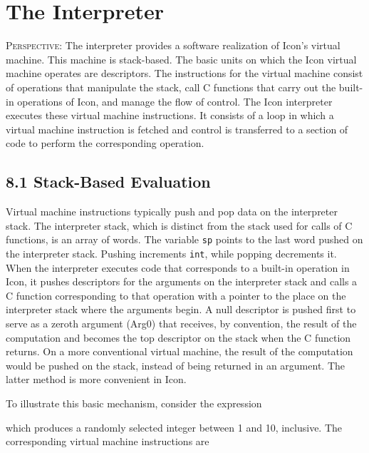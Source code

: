 \chapter{The Interpreter}

\textsc{Perspective}: The interpreter provides a software realization
of Icon's virtual machine. This machine is stack-based. The basic
units on which the Icon virtual machine operates are descriptors. The
instructions for the virtual machine consist of operations that
manipulate the stack, call C functions that carry out the built-in
operations of Icon, and manage the flow of control. The Icon
interpreter executes these virtual machine instructions.  It consists
of a loop in which a virtual machine instruction is fetched and
control is transferred to a section of code to perform the
corresponding operation.

\section[8.1 Stack-Based Evaluation]{8.1 Stack-Based Evaluation}

Virtual machine instructions typically push and pop data on the
interpreter stack. The interpreter stack, which is distinct from the
stack used for calls of C functions, is an array of words. The
variable \texttt{sp} points to the last word pushed on the interpreter
stack. Pushing increments \texttt{int}, while popping decrements
it. When the interpreter executes code that corresponds to a built-in
operation in Icon, it pushes descriptors for the arguments on the
interpreter stack and calls a C function corresponding to that
operation with a pointer to the place on the interpreter stack where
the arguments begin. A null descriptor is pushed first to serve as a
{\textquotedbl}zeroth{\textquotedbl} argument (Arg0) that receives, by
convention, the result of the computation and becomes the top
descriptor on the stack when the C function returns. On a more
conventional virtual machine, the result of the computation would be
pushed on the stack, instead of being returned in an argument. The
latter method is more convenient in Icon.

To illustrate this basic mechanism, consider the expression


\noindent which produces a randomly selected integer between 1 and 10,
inclusive. The corresponding virtual machine instructions are

